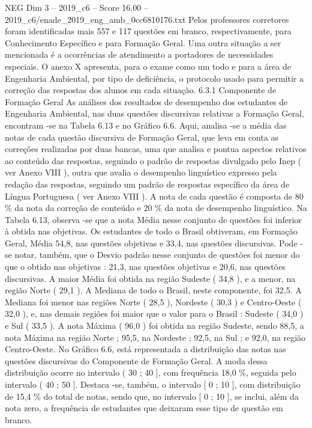 \begin{textsample}{NEG Dim 3 – 2019\_c6 – Score 16.00 – 2019\_c6/enade\_2019\_eng\_amb\_0cc6810176.txt}
Pelos professores corretores foram identificadas mais 557 e 117 questões em branco, respectivamente, para Conhecimento Específico e para Formação Geral.
Uma outra situação a ser mencionada é a ocorrências de atendimento a portadores de necessidades especiais.
O anexo X apresenta, para o exame como um todo e para a área de Engenharia Ambiental, por tipo de deficiência, o protocolo usado para permitir a correção das respostas dos alunos em cada situação. 6.3.1 Componente de Formação Geral As análises dos resultados de desempenho dos estudantes de Engenharia Ambiental, nas duas questões discursivas relativas a Formação Geral, encontram -se na Tabela 6.13 e no Gráfico 6.6.
Aqui, analisa -se a média das notas de cada questão discursiva de Formação Geral, que leva em conta as correções realizadas por duas bancas, uma que analisa e pontua aspectos relativos ao conteúdo das respostas, seguindo o padrão de respostas divulgado pelo Inep ( ver Anexo VIII ), outra que avalia o desempenho linguístico expresso pela redação das respostas, seguindo um padrão de respostas específico da área de Língua Portuguesa ( ver Anexo VIII ).
A nota de cada questão é composta de 80 \% da nota da correção de conteúdo e 20 \% da nota de desempenho linguístico.
Na Tabela 6.13, observa -se que a nota Média nesse conjunto de questões foi inferior à obtida nas objetivas.
Os estudantes de todo o Brasil obtiveram, em Formação Geral, Média 54,8, nas questões objetivas e 33,4, nas questões discursivas.
Pode -se notar, também, que o Desvio padrão nesse conjunto de questões foi menor do que o obtido nas objetivas : 21,3, nas questões objetivas e 20,6, nas questões discursivas.
A maior Média foi obtida na região Sudeste ( 34,8 ), e a menor, na região Norte ( 29,1 ).
A Mediana de todo o Brasil, neste componente, foi 32,5.
A Mediana foi menor nas regiões Norte ( 28,5 ), Nordeste ( 30,3 ) e Centro-Oeste ( 32,0 ), e, nas demais regiões foi maior que o valor para o Brasil : Sudeste ( 34,0 ) e Sul ( 33,5 ).
A nota Máxima ( 96,0 ) foi obtida na região Sudeste, sendo 88,5, a nota Máxima na região Norte ; 95,5, na Nordeste ; 92,5, na Sul ; e 92,0, na região Centro-Oeste.
No Gráfico 6.6, está representada a distribuição das notas nas questões discursivas do Componente de Formação Geral.
A moda dessa distribuição ocorre no intervalo ( 30 ; 40 ], com frequência 18,0 \%, seguida pelo intervalo ( 40 ; 50 ].
Destaca -se, também, o intervalo [ 0 ; 10 ], com distribuição de 15,4 \% do total de notas, sendo que, no intervalo [ 0 ; 10 ], se inclui, além da nota zero, a frequência de estudantes que deixaram esse tipo de questão em branco.

\end{textsample}

